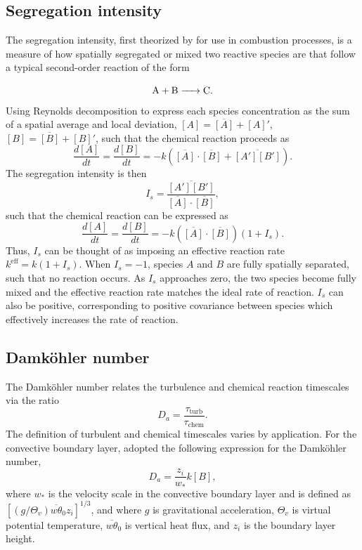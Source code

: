 \subsection{Segregation intensity}
The segregation intensity, first theorized by \textcite{danckwerts_definition_1952} for use in combustion processes, is a measure of how spatially segregated or mixed two reactive species are that follow a typical second-order reaction of the form

\begin{equation}
\ce{A + B -> C}.
\end{equation}
Using Reynolds decomposition to express each species concentration as the sum of a spatial average and local deviation, $[A] = \overline{[A]} + [A]'$, $[B] = \overline{[B]} + [B]'$, such that the  chemical reaction proceeds as 
\begin{equation}
\frac{d[A]}{dt} = \frac{d[B]}{dt} = -k\left(\overline{[A]}\cdot\overline{[B]} + \overline{[A'][B']} \right).
\end{equation}
The segregation intensity is then 
\begin{equation}
I_s = \frac{\overline{[A'][B']}}{\overline{[A]}\cdot\overline{[B]}},
\end{equation}
such that the chemical reaction can be expressed as 
\begin{equation}
\frac{d[A]}{dt} = \frac{d[B]}{dt} = -k\left(\overline{[A]}\cdot\overline{[B]}\right)\left(1 + I_s \right).
\end{equation}
Thus, $I_s$ can be thought of as imposing an effective reaction rate $k^{\text{eff}} = k(1+I_s)$. When $I_s = -1$, species $A$ and $B$ are fully spatially separated, such that no reaction occurs. As $I_s$ approaches zero, the two species become fully mixed and the effective reaction rate matches the ideal rate of reaction. $I_s$ can also be positive, corresponding to positive covariance between species which effectively increases the rate of reaction.

\subsection{Damköhler number}
The Damköhler number \parencite{damköhler_effect_1947} relates the turbulence and chemical reaction timescales via the ratio
\begin{equation}
D_a = \frac{\tau_{\text{turb}}}{\tau_{\text{chem}}}.
\end{equation}
The definition of turbulent and chemical timescales varies by application. For the convective boundary layer, \textcite{vinuesa_fluxes_2003} adopted the following expression for the Damköhler number,
\begin{equation}
D_a = \frac{z_i}{w_*}k[B],
\end{equation}
where $w_*$ is the velocity scale in the convective boundary layer and is defined as $\left[(g/\Theta_v)\overline{w\theta}_0 z_i\right]^{1/3}$, and where $g$ is gravitational acceleration, $\Theta_v$ is virtual potential temperature, $\overline{w\theta}_0$ is vertical heat flux, and $z_i$ is the boundary layer height.

